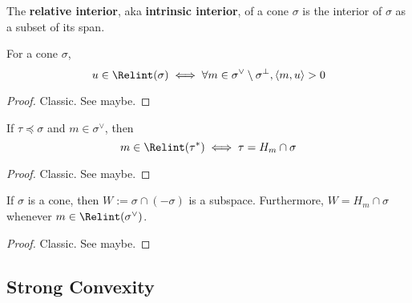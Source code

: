 \begin{definition}
  \label{1-2-rel-interior}
  \uses{}
  \leanok

  The {\bf relative interior}, aka {\bf intrinsic interior}, of a cone $\sigma$ is the interior of $\sigma$ as a subset of its span.
\end{definition}


\begin{lemma}
  \label{1-2-rel-interior-inner}

  For a cone $\sigma$,
  $$u \in \Relint(\sigma) \iff \forall m \in \sigma^\vee \setminus \sigma^\perp, \langle m, u\rangle > 0$$
\end{lemma}
\begin{proof}
  \uses{}

  Classic. See \cite{Oda_1988} maybe.
\end{proof}


\begin{lemma}
  \label{1-2-rel-interior-dual-face}

  If $\tau \preceq \sigma$ and $m \in \sigma^\vee$, then
  $$m \in \Relint(\tau^*) \iff \tau = H_m \cap \sigma$$
\end{lemma}
\begin{proof}
  \uses{}

  Classic. See \cite{Oda_1988} maybe.
\end{proof}


\begin{lemma}
  \label{1-2-min-face}

  If $\sigma$ is a cone, then $W := \sigma \cap (-\sigma)$ is a subspace. Furthermore,
  $W = H_m \cap \sigma$ whenever $m \in \Relint(\sigma^\vee)$.
\end{lemma}
\begin{proof}
  \uses{}

  Classic. See \cite{Oda_1988} maybe.
\end{proof}


\subsection{Strong Convexity}


